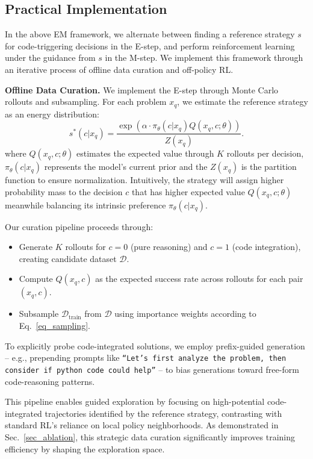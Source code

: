 \subsection{Practical Implementation}\label{sec_impl}
In the above EM framework, we alternate between finding a reference strategy \( s \) for code-triggering decisions  in the E-step, and perform reinforcement learning under the guidance from \( s \) in the M-step. We implement this framework through an iterative process of offline data curation and off-policy RL.

\noindent\textbf{Offline Data Curation.} We implement the E-step through Monte Carlo rollouts and subsampling. For each problem \(x_q\), we estimate the reference strategy as an energy distribution: 
\begin{equation}
    s^\ast(c | x_q)  = \frac{\exp\left(\alpha\cdot \pi_\theta(c | x_q) Q(x_q,c;\theta)\right)}{Z(x_q)}.\label{eq_sampling}
\end{equation}
where \( Q(x_q,c;\theta)\) estimates the expected value through \( K \) rollouts per decision, \(\pi_\theta(c|x_q) \) represents the model's current prior and the \( Z(x_q) \) is the partition function to ensure normalization. Intuitively, the strategy will assign higher probability mass to the decision \( c \) that has higher expected value \( Q(x_q,c;\theta)\) meanwhile balancing its intrinsic preference \( \pi_\theta(c|x_q)\). 

Our curation pipeline proceeds through: 
\begin{itemize}[leftmargin=0.5cm,topsep=1pt,itemsep=0pt,parsep=0pt]
\item Generate \(K\) rollouts for \(c=0\) (pure reasoning) and \(c=1\) (code integration), creating candidate dataset \(\mathcal{D}\).  
\item Compute \(Q(x_q,c)\) as the expected success rate across rollouts for each pair \((x_q,c)\).  
\item Subsample \(\mathcal{D}_{\text{train}}\) from \(\mathcal{D}\) using importance weights according to Eq.~\ref{eq_sampling}.  
\end{itemize}

To explicitly probe code-integrated solutions, we employ prefix-guided generation -- e.g., prepending prompts like \texttt{``Let’s first analyze the problem, then consider if python code could help''} -- to bias generations toward free-form code-reasoning patterns.

 This pipeline enables guided exploration by focusing on high-potential code-integrated trajectories identified by the reference strategy, contrasting with standard RL’s reliance on local policy neighborhoods. As demonstrated in Sec.~\ref{sec_ablation}, this strategic data curation significantly improves training efficiency by shaping the exploration space.





